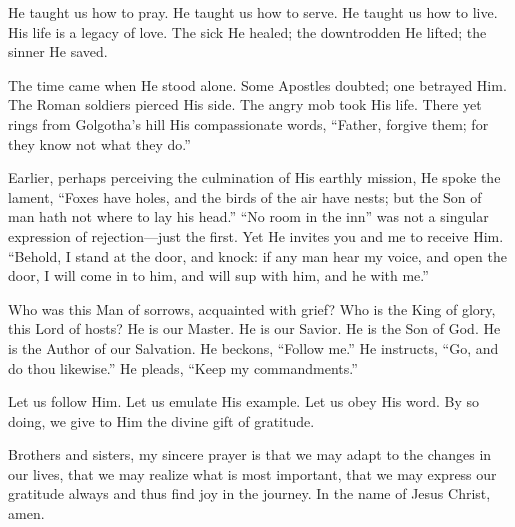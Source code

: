 \documentclass[letterpaper, 11pt]{report}
\begin{document}
He taught us how to pray. He taught us how to serve. He taught us how to live. His life is a legacy of love. The sick He healed; the downtrodden He lifted; the sinner He saved.

The time came when He stood alone. Some Apostles doubted; one betrayed Him. The Roman soldiers pierced His side. The angry mob took His life. There yet rings from Golgotha’s hill His compassionate words, “Father, forgive them; for they know not what they do.”

Earlier, perhaps perceiving the culmination of His earthly mission, He spoke the lament, “Foxes have holes, and the birds of the air have nests; but the Son of man hath not where to lay his head.” “No room in the inn” was not a singular expression of rejection—just the first. Yet He invites you and me to receive Him. “Behold, I stand at the door, and knock: if any man hear my voice, and open the door, I will come in to him, and will sup with him, and he with me.”

Who was this Man of sorrows, acquainted with grief? Who is the King of glory, this Lord of hosts? He is our Master. He is our Savior. He is the Son of God. He is the Author of our Salvation. He beckons, “Follow me.” He instructs, “Go, and do thou likewise.” He pleads, “Keep my commandments.”

Let us follow Him. Let us emulate His example. Let us obey His word. By so doing, we give to Him the divine gift of gratitude.

Brothers and sisters, my sincere prayer is that we may adapt to the changes in our lives, that we may realize what is most important, that we may express our gratitude always and thus find joy in the journey. In the name of Jesus Christ, amen.
\end{document}
